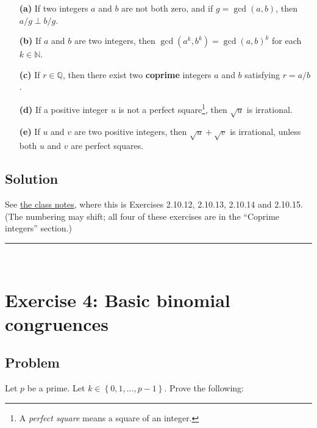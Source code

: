 \documentclass[paper=a4, fontsize=12pt]{scrartcl} %
\newcommand{\QQ}{\mathbb{Q}} %
\newcommand{\NN}{\mathbb{N}} %
\newcommand{\set}[1]{\left\{ #1 \right\}}
\newcommand{\tup}[1]{\left( #1 \right)}
\newcommand{\horrule}[1]{\rule{\linewidth}{#1}} %
\theoremstyle{plainsl}
\theoremstyle{definition}
\theoremstyle{remark}
\begin{document}
\begin{enumerate}

\item[\textbf{(a)}]
If two integers $a$ and $b$ are not both zero, and
if $g = \gcd\tup{a, b}$, then $a/g \perp b/g$.

\item[\textbf{(b)}]
If $a$ and $b$ are two integers, then
$\gcd\tup{a^k, b^k} = \gcd\tup{a, b}^k$ for each
$k \in \NN$.

\item[\textbf{(c)}]
If $r \in \QQ$, then there exist two \textbf{coprime}
integers $a$ and $b$ satisfying $r = a/b$.

\item[\textbf{(d)}]
If a positive integer $u$ is not a perfect
square\footnote{A \textit{perfect square} means a square
of an integer.},
then $\sqrt{u}$ is irrational.

\item[\textbf{(e)}]
If $u$ and $v$ are two positive integers,
then $\sqrt{u} + \sqrt{v}$ is irrational,
unless both $u$ and $v$ are perfect squares.

\end{enumerate}

\subsection{Solution}

See
\href{http://www.cip.ifi.lmu.de/~grinberg/t/19s/notes.pdf}{the class notes},
where this is Exercises 2.10.12, 2.10.13, 2.10.14 and 2.10.15.
(The numbering may shift; all four of these exercises are in the
``Coprime integers''
section.)

\horrule{0.3pt} \\[0.4cm]

\section{Exercise 4: Basic binomial congruences}

\subsection{Problem}

Let $p$ be a prime.
Let $k \in \set{0, 1, \ldots, p-1}$.
Prove the following:
\end{document}

